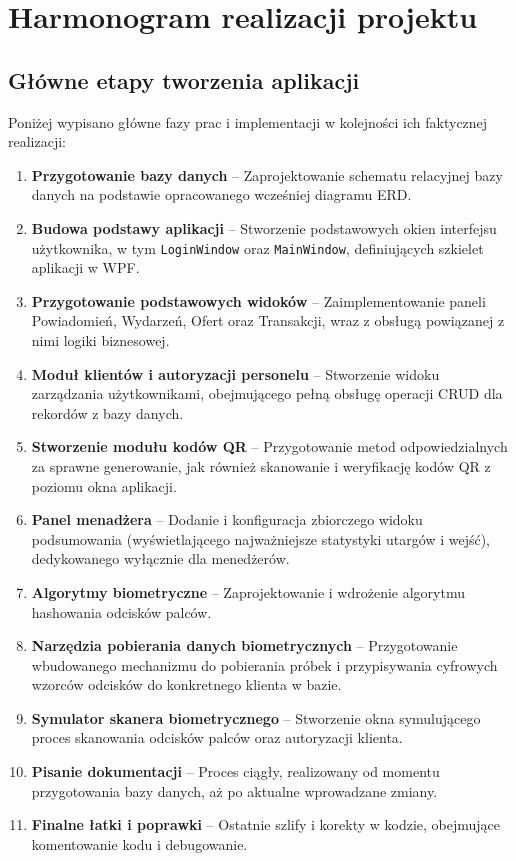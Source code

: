 \chapter{Harmonogram realizacji projektu}
\label{ch:harmonogram}

\section{Główne etapy tworzenia aplikacji}
Poniżej wypisano główne fazy prac i implementacji w kolejności ich faktycznej realizacji:

\begin{enumerate}
    \item \textbf{Przygotowanie bazy danych} -- Zaprojektowanie schematu relacyjnej bazy danych na podstawie opracowanego wcześniej diagramu ERD.
    \item \textbf{Budowa podstawy aplikacji} -- Stworzenie podstawowych okien interfejsu użytkownika, w tym \texttt{LoginWindow} oraz \texttt{MainWindow}, definiujących szkielet aplikacji w WPF.
    \item \textbf{Przygotowanie podstawowych widoków} -- Zaimplementowanie paneli Powiadomień, Wydarzeń, Ofert oraz Transakcji, wraz z obsługą powiązanej z nimi logiki biznesowej.
    \item \textbf{Moduł klientów i autoryzacji personelu} -- Stworzenie widoku zarządzania użytkownikami, obejmującego pełną obsługę operacji CRUD dla rekordów z bazy danych.
    \item \textbf{Stworzenie modułu kodów QR} -- Przygotowanie metod odpowiedzialnych za sprawne generowanie, jak również skanowanie i weryfikację kodów QR z poziomu okna aplikacji.
    \item \textbf{Panel menadżera} -- Dodanie i konfiguracja zbiorczego widoku podsumowania (wyświetlającego najważniejsze statystyki utargów i wejść), dedykowanego wyłącznie dla menedżerów.
    \item \textbf{Algorytmy biometryczne} -- Zaprojektowanie i wdrożenie algorytmu hashowania odcisków palców.
    \item \textbf{Narzędzia pobierania danych biometrycznych} -- Przygotowanie wbudowanego mechanizmu do pobierania próbek i przypisywania cyfrowych wzorców odcisków do konkretnego klienta w bazie.
    \item \textbf{Symulator skanera biometrycznego} -- Stworzenie okna symulującego proces skanowania odcisków palców oraz autoryzacji klienta.
    \item \textbf{Pisanie dokumentacji} -- Proces ciągły, realizowany od momentu przygotowania bazy danych, aż po aktualne wprowadzane zmiany.
    \item \textbf{Finalne łatki i poprawki} -- Ostatnie szlify i korekty w kodzie, obejmujące komentowanie kodu i debugowanie.
\end{enumerate}

